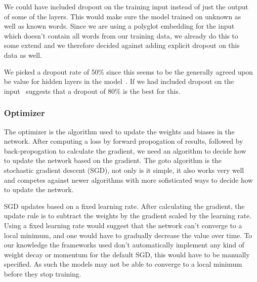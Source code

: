 We could have included dropout on the training input instead of just the output
of some of the layers. This would make sure the model trained on unknown as well
as known words. Since we are using a polyglot embedding for the input which
doesn't contain all words from our training data, we already do this to some
extend and we therefore decided against adding explicit dropout on this data as
well.

We picked a dropout rate of 50\% since this seems to be the generally agreed
upon be value for hidden layers in the model~\cite{}. If we had included dropout
on the input~\cite{} suggests that a dropout of 80\% is the best for this.


\subsubsection{Optimizer}

The optimizer is the algorithm used to update the weights and biases in the
network. After computing a loss by forward propogation of results, followed by
back-propogation to calculate the gradient, we need an algorithm to decide how
to update the network based on the gradient. The goto algorithm is the
stochastic gradient descent (SGD), not only is it simple, it also works very
well and competes against newer algorithms with more sofisticated ways to decide
how to update the network.

SGD updates based on a fixed learning rate. After calculating the gradient, the
update rule is to subtract the weights by the gradient scaled by the learning
rate. Using a fixed learning rate would suggest that the network can't converge
to a local minimum, and one would have to gradually decrease the value over
time. To our knowledge the frameworks used don't automatically implement any
kind of weight decay or momentum for the default SGD, this would have to be
manually specified. As such the models may not be able to converge to a local
minimum before they stop training.
